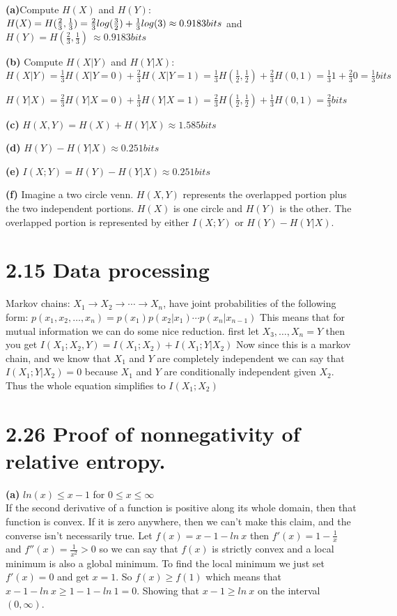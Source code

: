 \documentclass[10pt]{article}
\begin{document}
\begin{tiny}
\begin{multicols}{3}
\textbf{(a)}Compute  \(H(X)\) and \( H(Y)\):~~
\(
H(X) = H(\frac{2}{3},\frac{1}{3})
= \frac{2}{3} log(\frac{3}{2}) + \frac{1}{3}log(3)\\
\approx 0.9183 bits \) and \(
H(Y) =  H(\frac{2}{3},\frac{1}{3})\
\approx 0.9183 bits
\)
              
\textbf{(b)} Compute \(H(X|Y)\) and \(H(Y|X)\):~~
\(
H(X|Y) = \frac{1}{3}H(X|Y=0) + \frac{2}{3}H(X|Y=1)
=\frac{1}{3}H(\frac{1}{2},\frac {1}{2})+\frac{2}{3}H(0,1)
=\frac{1}{3}1+\frac{2}{3}0 
= \frac{1}{3} bits \) 
                
\(
H(Y|X) = \frac{2}{3}H(Y|X=0)+\frac{1}{3}H(Y|X=1)
=\frac{2}{3}H(\frac{1}{2},\frac{1}{2}) + \frac{1}{3}H(0,1)
=\frac{2}{3} bits
\)
              
\textbf{(c)}
\(
H(X,Y)=H(X)+H(Y|X)
\approx 1.585 bits
\)
          	  
\textbf{(d)} \(H(Y) - H(Y|X) \approx 0.251 bits\)
            	
\textbf{(e)} \( I(X;Y) =H(Y) - H(Y|X) \approx 0.251 bits
\)
		
\textbf{(f)}  Imagine a two circle venn. $H(X,Y)$ represents the overlapped portion plus the two independent portions. $H(X)$ is one circle and $H(Y)$ is the other. The overlapped portion is represented by either $I(X;Y)$ or $H(Y)-H(Y|X)$.
          
\section*{2.15 Data processing} Markov chains: $X_{1}\rightarrow X_{2}\rightarrow \cdots \rightarrow X_{n}$, have joint probabilities of the following form: 
\(
p(x_{1},x_{2},\ldots,x_{n})=p(x_{1})p(x_{2}|x_{1})\cdots p(x_{n}|x_{n-1})
\)
This means that for mutual information we can do some nice reduction.
first let \( X_{3},\ldots,X_{n} = Y\) then you get \(
I(X_{1};X_{2},Y) = I(X_{1};X_{2})+I(X_{1};Y|X_{2})  \)
Now since this is a markov chain, and we know that $X_{1}$ and $Y$ are completely independent
we can say that $I(X_{1};Y|X_{2})=0$ because $X_1$ and $Y$ are conditionally independent given $X_2$. 
Thus the whole equation simplifies to $I(X_{1};X_{2})$

\section*{2.26 Proof of nonnegativity of relative entropy.}
\textbf{(a)} $ln(x) \leq x-1$ for $0\leq x \leq \infty$\\
If the second derivative of a function is positive along its whole domain, 
then that function is convex. 
If it is zero anywhere, then we can't make this claim, 
and the converse isn't necessarily true.
Let \(f(x)=x-1-ln\ x \) then 
\(
f'(x)= 1-\frac{1}{x}\) and \(
f''(x)=\frac{1}{x^2} > 0
\)
so we can say that $f(x)$ is strictly convex and a local minimum is also a global minimum. 
To find the local minimum we just set $f'(x)=0$ and get $x=1$. 
So $f(x) \geq f(1)$ which means that $x-1-ln\ x \geq 1-1-ln\ 1 = 0$. 
Showing that $x-1 \geq ln\ x$ on the interval $(0,\infty)$.
				 

\end{multicols}
\end{tiny}
\end{document}
